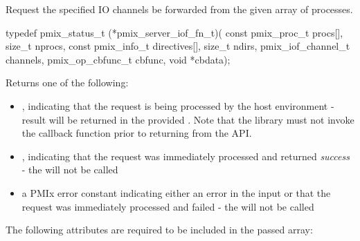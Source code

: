 \summary

Request the specified IO channels be forwarded from the given array of processes.

\format

\cspecificstart
\begin{codepar}
typedef pmix_status_t (*pmix_server_iof_fn_t)(
                        const pmix_proc_t procs[], size_t nprocs,
                        const pmix_info_t directives[], size_t ndirs,
                        pmix_iof_channel_t channels,
                        pmix_op_cbfunc_t cbfunc, void *cbdata);
\end{codepar}
\cspecificend

\begin{arglist}
\end{arglist}

Returns one of the following:

\begin{itemize}
    \item {}, indicating that the request is being processed by the host environment - result will be returned in the provided . Note that the library must not invoke the callback function prior to returning from the \ac{API}.
    \item {}, indicating that the request was immediately processed and returned \textit{success} - the  will not be called
    \item a PMIx error constant indicating either an error in the input or that the request was immediately processed and failed - the  will not be called
\end{itemize}


\reqattrstart
The following attributes are required to be included in the passed  array:


